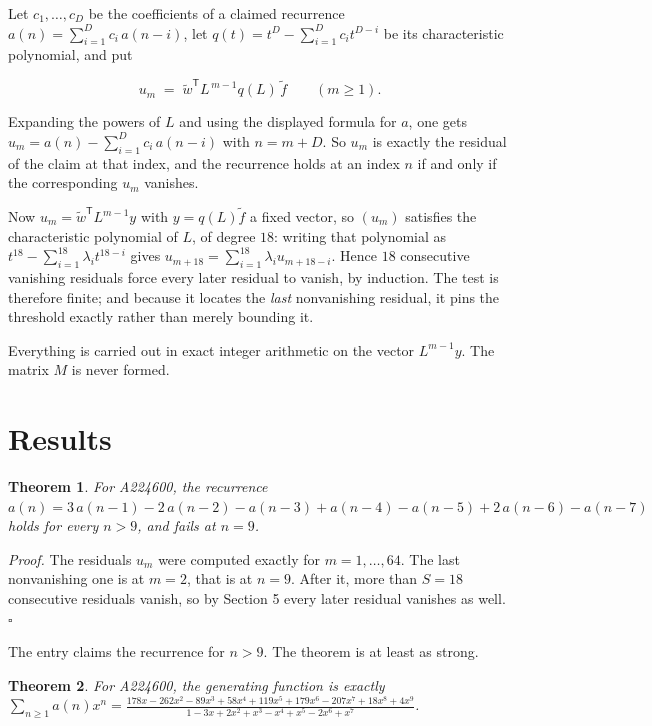 \documentclass[11pt]{article}
\newtheorem{theorem}{Theorem}
\theoremstyle{definition}
\begin{document}
Let $c_1,\dots,c_D$ be the coefficients of a claimed recurrence $a(n) = \sum_{i=1}^{D} c_i\,a(n-i)$, let $q(t) = t^{D} - \sum_{i=1}^{D} c_i t^{D-i}$ be its characteristic polynomial, and put

\[u_m \;=\; \tilde w^{\mathsf T} L^{\,m-1} q(L)\,\tilde f \qquad (m \ge 1).\]

Expanding the powers of $L$ and using the displayed formula for $a$, one gets $u_m = a(n) - \sum_{i=1}^{D} c_i\,a(n-i)$ with $n = m + D$. So $u_m$ is exactly the residual of the claim at that index, and the recurrence holds at an index $n$ if and only if the corresponding $u_m$ vanishes.

Now $u_m = \tilde w^{\mathsf T} L^{m-1} y$ with $y = q(L)\tilde f$ a fixed vector, so $(u_m)$ satisfies the characteristic polynomial of $L$, of degree $18$: writing that polynomial as $t^{18} - \sum_{i=1}^{18} \lambda_i t^{18-i}$ gives $u_{m+18} = \sum_{i=1}^{18} \lambda_i u_{m+18-i}$. Hence $18$ consecutive vanishing residuals force every later residual to vanish, by induction. The test is therefore finite; and because it locates the {\itshape last} nonvanishing residual, it pins the threshold exactly rather than merely bounding it.

Everything is carried out in exact integer arithmetic on the vector $L^{m-1}y$. The matrix $M$ is never formed.

\section{Results}

\begin{theorem} For A224600, the recurrence $a(n) = 3\,a(n-1) - 2\,a(n-2) - a(n-3) + a(n-4) - a(n-5) + 2\,a(n-6) - a(n-7)$ holds for every $n > 9$, and fails at $n = 9$.\end{theorem}

{\itshape Proof.} The residuals $u_m$ were computed exactly for $m = 1,\dots,64$. The last nonvanishing one is at $m = 2$, that is at $n = 9$. After it, more than $S = 18$ consecutive residuals vanish, so by Section 5 every later residual vanishes as well. $\square$

The entry claims the recurrence for $n > 9$. The theorem is at least as strong.

\begin{theorem} For A224600, the generating function is exactly $\sum_{n\ge 1} a(n)x^n = \frac{178x - 262x^{2} - 89x^{3} + 58x^{4} + 119x^{5} + 179x^{6} - 207x^{7} + 18x^{8} + 4x^{9}}{1 - 3x + 2x^{2} + x^{3} - x^{4} + x^{5} - 2x^{6} + x^{7}}$.\end{theorem}
\end{document}
